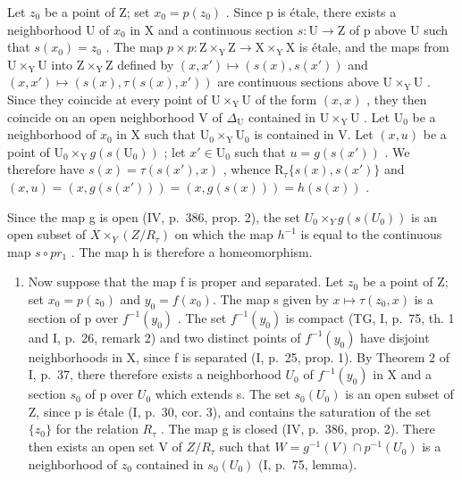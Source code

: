 Let \(z_0\) be a point of Z; set \(x_0 = p(z_0)\) . Since p is étale, there exists a neighborhood U of \(x_0\) in X and a continuous section \(s: \mathrm{U} \to \mathrm{Z}\) of p above U such that \(s(x_0) = z_0\) . The map \(p \times p: \mathrm{Z} \times_{\mathrm{Y}} \mathrm{Z} \to \mathrm{X} \times_{\mathrm{Y}} \mathrm{X}\) is étale, and the maps from \(\mathrm{U} \times_{\mathrm{Y}} \mathrm{U}\) into \(\mathrm{Z} \times_{\mathrm{Y}} \mathrm{Z}\) defined by \((x, x') \mapsto (s(x), s(x'))\) and \((x, x') \mapsto (s(x), \tau(s(x), x'))\) are continuous sections above \(\mathrm{U} \times_{\mathrm{Y}} \mathrm{U}\) . Since they coincide at every point of \(\mathrm{U} \times_{\mathrm{Y}} \mathrm{U}\) of the form \((x, x)\) , they then coincide on an open neighborhood V of \(\Delta_{\mathrm{U}}\) contained in \(\mathrm{U} \times_{\mathrm{Y}} \mathrm{U}\) . Let \(\mathrm{U}_0\) be a neighborhood of \(x_0\) in X such that \(\mathrm{U}_0 \times_{\mathrm{Y}} \mathrm{U}_0\) is contained in V. Let \((x, u)\) be a point of \(\mathrm{U}_0 \times_{\mathrm{Y}} g(s(\mathrm{U}_0))\) ; let \(x' \in \mathrm{U}_0\) such that \(u = g(s(x'))\) . We therefore have \(s(x) = \tau(s(x'), x)\) , whence \(\mathrm{R}_{\tau}\{s(x), s(x')\}\) and \((x, u) = (x, g(s(x'))) = (x, g(s(x))) = h(s(x))\) .

Since the map g is open (IV, p.~386, prop. 2), the set \(U_{0} \times_{Y} g(s(U_{0}))\) is an open subset of \(X \times_{Y}(Z/R_{\tau})\) on which the map \(h^{-1}\) is equal to the continuous map \(s \circ pr_{1}\) . The map h is therefore a homeomorphism.

\begin{enumerate}
\def\labelenumi{\alph{enumi})}
\setcounter{enumi}{1}
\tightlist
\item
  Now suppose that the map f is proper and separated. Let \(z_{0}\) be a point of Z; set \(x_{0}=p(z_{0})\) and \(y_{0}=f(x_{0})\). The map s given by \(x\mapsto\tau(z_{0},x)\) is a section of p over \(f^{-1}(y_{0})\) . The set \(f^{-1}(y_{0})\) is compact (TG, I, p.~75, th. 1 and I, p.~26, remark 2) and two distinct points of \(f^{-1}(y_{0})\) have disjoint neighborhoods in X, since f is separated (I, p.~25, prop. 1). By Theorem 2 of I, p.~37, there therefore exists a neighborhood \(U_{0}\) of \(f^{-1}(y_{0})\) in X and a section \(s_{0}\) of p over \(U_{0}\) which extends s. The set \(s_{0}(U_{0})\) is an open subset of Z, since p is étale (I, p.~30, cor. 3), and contains the saturation of the set \(\{z_{0}\}\) for the relation \(R_{\tau}\) . The map g is closed (IV, p.~386, prop. 2). There then exists an open set V of \(Z/R_{\tau}\) such that \(W = g^{-1}(V) \cap p^{-1}(U_{0})\) is a neighborhood of \(z_{0}\) contained in \(s_{0}(U_{0})\) (I, p.~75, lemma).
\end{enumerate}

